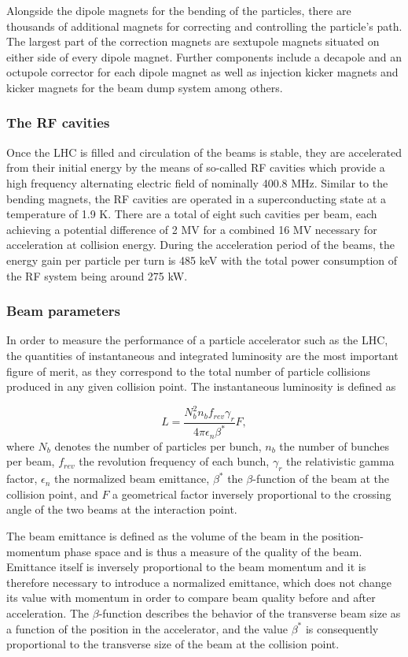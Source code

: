 Alongside the dipole magnets for the bending of the particles, there are thousands of additional magnets for correcting
and controlling the particle's path. The largest part of the correction magnets are sextupole magnets situated
on either side of every dipole magnet. Further components include a decapole and an octupole corrector for
each dipole magnet as well as injection kicker magnets and kicker magnets for the beam dump system among others.

\subsubsection*{The RF cavities}
Once the LHC is filled and circulation of the beams is stable, they are accelerated from their initial energy
by the means of so-called RF cavities which provide a high frequency alternating electric field of nominally
400.8 MHz. Similar to the bending magnets, the RF cavities are operated in a superconducting state at a temperature
of 1.9 K.
There are a total of eight such cavities per beam, each achieving a potential difference of 2 MV for a combined 16 MV 
necessary for acceleration at collision energy. During the acceleration period of the beams, the energy gain
per particle per turn is 485 keV with the total power consumption of the RF system being around 275 kW. 

\subsubsection*{Beam parameters}
In order to measure the performance of a particle accelerator such as the LHC, the quantities of instantaneous and integrated
luminosity are the most important figure of merit, as they correspond to the total number of particle collisions
produced in any given collision point. The instantaneous luminosity is defined as

\begin{equation}
    L = \frac{N_b^2 n_b f_{rev} \gamma_r}{4 \pi \epsilon_n \beta^*} F,
\end{equation}
where $N_b$ denotes the number of particles per bunch, $n_b$ the number of bunches per beam, $f_{rev}$ the revolution 
frequency of each bunch, $\gamma_r$ the relativistic gamma factor, $\epsilon_n$ the normalized beam emittance,
$\beta^*$ the $\beta$-function of the beam at the collision point, and $F$ a geometrical factor inversely proportional
to the crossing angle of the two beams at the interaction point. 

The beam emittance is defined as the 
volume of the beam in the position-momentum phase space and is thus a measure of the quality of the beam. Emittance itself is 
inversely proportional to the beam momentum and it is therefore necessary to introduce a normalized emittance, which does not change
its value with momentum in order to compare beam quality before and after acceleration. The $\beta$-function describes the
behavior of the transverse beam size as a function of the position in the accelerator, and the value $\beta^*$ is consequently
proportional to the transverse size of the beam at the collision point.

